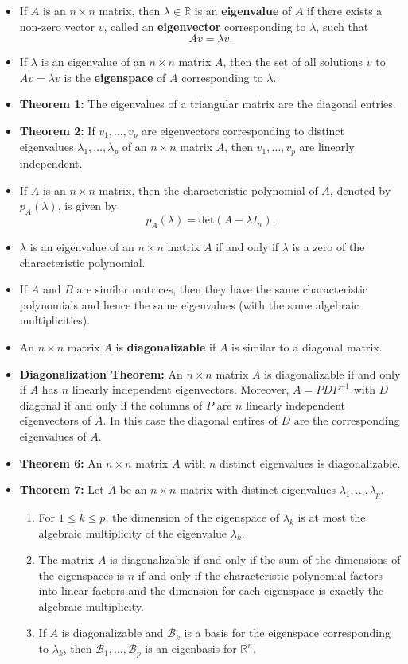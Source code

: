 \begin{itemize}
\item If $A$ is an $n \times n$ matrix, then $\lambda \in \mathbb{R}$ is an {\bf eigenvalue} of $A$ if there exists a non-zero vector $v$, called an {\bf eigenvector} corresponding to $\lambda$, such that $$Av=\lambda v.$$
\item If $\lambda$ is an eigenvalue of an $n \times n$ matrix $A$, then the set of all solutions $v$ to $Av = \lambda v$ is the {\bf eigenspace} of $A$ corresponding to $\lambda$.
\item {\bf Theorem 1:} The eigenvalues of a triangular matrix are the diagonal entries.
\item {\bf Theorem 2:} If $v_1, \dots, v_p$ are eigenvectors corresponding to distinct eigenvalues $\lambda_1, \dots, \lambda_p$ of an $n\times n$ matrix $A$, then $v_1, \dots, v_p$ are linearly independent.
\item If $A$ is an $n\times n$ matrix, then the characteristic polynomial of $A$, denoted by $p_A(\lambda)$, is given by $$p_A(\lambda)=\text{det}(A-\lambda I_n).$$
\item $\lambda$ is an eigenvalue of an $n\times n$ matrix $A$ if and only if $\lambda$ is a zero of the characteristic polynomial.
\item If $A$ and $B$ are similar matrices, then they have the same characteristic polynomials and hence the same eigenvalues (with the same algebraic multiplicities). 
\item An $n\times n$ matrix $A$ is {\bf diagonalizable} if $A$ is similar to a diagonal matrix.
\item {\bf Diagonalization Theorem:} An $n \times n$ matrix $A$ is diagonalizable if and only if $A$ has $n$ linearly independent eigenvectors. Moreover, $A=PDP^{-1}$ with $D$ diagonal if and only if the columns of $P$ are $n$ linearly independent eigenvectors of $A$. In this case the diagonal entires of $D$ are the corresponding eigenvalues of $A$.
\item {\bf Theorem 6:} An $n \times n$ matrix $A$ with $n$ distinct eigenvalues is diagonalizable.
\item 
{\bf Theorem 7:} Let $A$ be an $n\times n$ matrix with distinct eigenvalues $\lambda_1, \dots, \lambda_p$.
\begin{enumerate}
\item For $1\leq k \leq p$, the dimension of the eigenspace of $\lambda_k$ is at most the algebraic multiplicity of the eigenvalue $\lambda_k$.
\item The matrix $A$ is diagonalizable if and only if the sum of the dimensions of the eigenspaces is $n$ if and only if the characteristic polynomial factors into linear factors and the dimension for each eigenspace is exactly the algebraic multiplicity.
\item If $A$ is diagonalizable and $\mathcal{B}_k$ is a basis for the eigenspace corresponding to $\lambda_k$, then $\mathcal{B}_1, \dots, \mathcal{B}_p$ is an eigenbasis for $\mathbb{R}^n$.
\end{enumerate}
\end{itemize}


